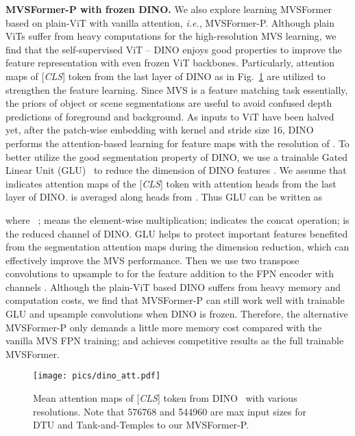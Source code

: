 \documentclass[10pt]{article} \usepackage[preprint]{tmlr}
\begin{document}
\noindent\textbf{MVSFormer-P with frozen DINO.}
We also explore learning MVSFormer based on plain-ViT with vanilla attention, \emph{i.e.}, MVSFormer-P. Although plain ViTs suffer from heavy computations for the high-resolution MVS learning, we find that the self-supervised ViT -- DINO enjoys good properties to improve the feature representation with even frozen ViT backbones.
Particularly, attention maps of [\emph{CLS}] token from the last layer of DINO as in Fig.~\ref{fig:dino_att} are utilized to strengthen the feature learning.
Since MVS is a feature matching task essentially, the priors of object or scene segmentations are useful to avoid confused depth predictions of foreground and background.
As inputs to ViT have been halved yet, after the patch-wise embedding with kernel and stride size 16, DINO performs the attention-based learning for feature maps with the resolution of .
To better utilize the good segmentation property of DINO, we use a trainable Gated Linear Unit (GLU)~\citep{shazeer2020glu} to reduce the dimension of DINO features . We assume that   indicates attention maps of the [\emph{CLS}] token with  attention heads from the last layer of DINO.  is averaged along  heads from . Thus GLU can be written as

where ~\citep{ramachandran2017searching};  means the element-wise multiplication;  indicates the concat operation;  is the reduced channel of DINO. GLU helps to protect important features benefited from the segmentation attention maps during the dimension reduction, which can effectively improve the MVS performance. 
Then we use two transpose convolutions to upsample  to  for the feature addition to the FPN encoder with channels . Although the plain-ViT based DINO suffers from heavy memory and computation costs, we find that MVSFormer-P can still work well with trainable GLU and upsample convolutions when DINO is frozen. Therefore, the alternative MVSFormer-P only demands a little more memory cost compared with the vanilla MVS FPN training; and achieves competitive results as the full trainable MVSFormer.



\begin{figure}
\begin{centering}
\texttt{[image: pics/dino\_att.pdf]} 
\par\end{centering}
\caption{Mean attention maps of [\emph{CLS}] token from DINO~\citep{caron2021emerging} with various resolutions. Note that 576768 and 544960 are max input sizes for DTU and Tank-and-Temples to our MVSFormer-P.}
\label{fig:dino_att}
\vspace{-0.1in}
\end{figure}
\end{document}
